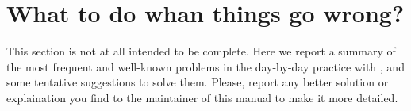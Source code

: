 
\thispagestyle{empty}
\section{What to do whan things go wrong?}
\label{section:troubleshot}
%
This section is not at all intended to be complete. Here we report a summary of the
most frequent and well-known problems in the day-by-day practice with \WANT,
and some tentative suggestions to solve them. 
Please, report any better solution or explaination you find to the maintainer of this
manual to make it more detailed.

